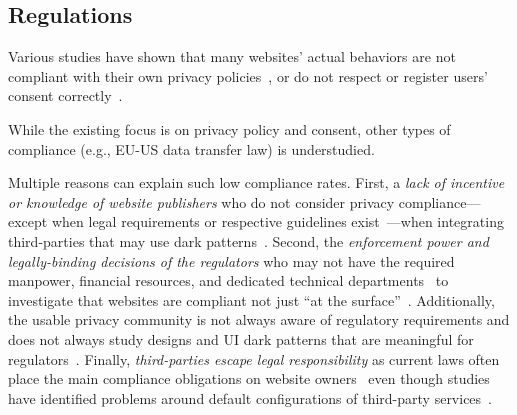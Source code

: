 
\subsection{Regulations}
\label{sec:compliance}

Various studies have shown that many websites' actual behaviors are not compliant with their own privacy policies~\cite{libertAutomatedApproachAuditing2018,ouViopolicyDetectorAutomatedApproach2022}, or do not respect or register users’ %
consent correctly~\cite{carpinetoAutomaticAssessmentWebsite2016,sanchezrolaCanIOptOutYet2019,matteCookieBannersRespect2020,mehrnezhadCrossPlatformEvaluationPrivacy2020,bouhoulaAutomatedLargeScaleAnalysis2024,vannortwickSettingBarLow2022,birrellSoKTechnicalImplementation2024,Kanc-etal-25-PETs}.

\begin{opbox}
While the existing focus is on privacy policy and consent, other types of compliance (e.g., EU-US data transfer law) is understudied.
\end{opbox}


Multiple reasons can explain such low compliance rates. First, a \textit{lack of incentive or knowledge of website publishers} who do not consider privacy compliance---except when legal requirements or respective guidelines exist~\cite{utzPrivacyRarelyConsidered2023,Stov-etal-23-PETs}---when integrating third-parties that may use dark patterns~\cite{tothDarkPatternsManipulation2022,grayDarkPatternsLegal2021}. Second, the \textit{enforcement power and legally-binding decisions of the regulators} who may not have the required manpower, financial resources, and dedicated technical departments~\cite{edpbContributionEDPBReport2023} to investigate that websites are compliant not just ``at the surface''~\cite{kyiInvestigatingDeceptiveDesign2023}. Additionally, the usable privacy community is not always aware of regulatory requirements and does not always study designs and UI dark patterns that are meaningful for regulators~\cite{Bielova2024-zr}. 
Finally, \textit{third-parties escape legal responsibility} as current laws often place the main compliance obligations on website owners~\cite{santosConsentManagementPlatforms2021} even though studies have identified problems around default configurations of third-party services~\cite{Koch-etal-25-PETs,Rodr-etal-25-PETs}.

